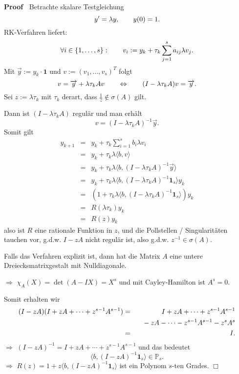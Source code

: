 \documentclass{book}
\newcommand{\assign}{:=}
\newcommand{\tmmathbf}[1]{\ensuremath{\boldsymbol{#1}}}
\newenvironment{proof}{\noindent\textbf{Proof\ }}{\hspace*{\fill}$\Box$\medskip}
\begin{document}
\begin{proof}
  Betrachte skalare Testgleichung
  \[ y' = \lambda y, \text{\qquad} y (0) = 1. \]
  {\hspace{1.7em}}RK-Verfahren liefert:
  \[ \forall i \in \{ 1, \ldots, s \} : \text{\qquad} v_i \assign y_k +
     \tau_k \sum_{j = 1}^s a_{i j} \lambda v_j . \]
  {\hspace{1.7em}}Mit $\overrightarrow{{y } } \assign y_k \cdot \tmmathbf{1}$
  und $v \assign (v_1, \ldots, v_s)^T$ folgt
  \[ v = \overrightarrow{{y } } + \lambda \tau_k A v \qquad \Leftrightarrow
     \text{\qquad} (I - \lambda \tau_k A) v = \overrightarrow{{y } } . \]
  {\hspace{1.7em}}Sei $z \assign \lambda \tau_k$ mit $\tau_k$ derart, dass
  $\frac{1}{z} \notin \sigma (A)$ gilt.
  
  Dann ist $(I - \lambda \tau_k A)$ regul{\"a}r und man erh{\"a}lt
  \[ v = (I - \lambda \tau_k A)^{- 1} \overrightarrow{{y } } . \]
  {\hspace{1.7em}}Somit gilt
  \begin{eqnarray*}
    y_{k + 1} & = & y_k + \tau_k \sum_{i = 1}^s b_i \lambda v_i\\
    & = & y_k + \tau_k \lambda \langle b, v \rangle\\
    & = & y_k + \tau_k \lambda \langle b, (I - \lambda \tau_k A)^{- 1}
    \overrightarrow{{y } } \rangle\\
    & = & y_k + \tau_k \lambda \langle b, (I - \lambda \tau_k A)^{- 1}
    \tmmathbf{1}_s \rangle y_k\\
    & = & (1 + \tau_k \lambda \langle b, (I - \lambda \tau_k A)^{- 1}
    \tmmathbf{1}_s \rangle) y_k\\
    & = & R (\lambda \tau_k) y_k\\
    & = & R (z) y_k
  \end{eqnarray*}
  also ist $R$ eine rationale Funktion in $z$, und die Pollstellen /
  Singularit{\"a}ten tauchen vor, g.d.w. $I - z A$ nicht regul{\"a}r ist, also
  g.d.w. $z^{- 1} \in \sigma (A)$.
  
  Falls das Verfahren explizit ist, dann hat die Matrix $A$ eine untere
  Dreiecksmatrixgestalt mit Nulldiagonale.
  
  $\Rightarrow$ $\chi_A (X) = \det (A - I X) = X^s$ und mit Cayley-Hamilton
  ist $A^s = 0$.
  
  Somit erhalten wir
  \begin{eqnarray*}
    (I - z A) (I + z A + \cdots + z^{s - 1} A^{s - 1}) & = & I + z A + \cdots
    + z^{s - 1} A^{s - 1}\\
    &  & \text{{\hspace{0.75em}}} - z A - \cdots - z^{s - 1} A^{s - 1} - z^s
    A^s\\
    & = & I.
  \end{eqnarray*}
  {\hspace{1.7em}}$\Rightarrow$ $(I - z A)^{- 1} = I + z A + \cdots + z^{s -
  1} A^{s - 1}$ und das bedeutet
  \[ \langle b, (I - z A)^{- 1} \tmmathbf{1}_s \rangle \in \mathbb{P}_s . \]
  {\hspace{1.7em}}$\Rightarrow$ $R (z) = 1 + z \langle b, (I - z A)^{- 1}
  \tmmathbf{1}_s \rangle$ ist ein Polynom $s$-ten Grades.
\end{proof}
\end{document}
